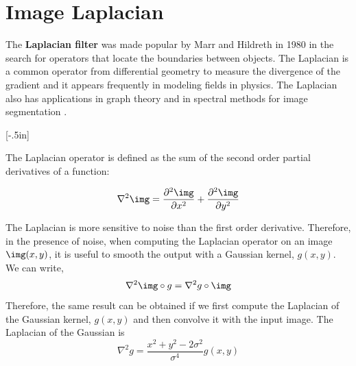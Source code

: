 

\section{Image Laplacian}

The {\bf Laplacian filter}
was made popular by Marr and Hildreth in 1980 \cite{Marr80} in the search for operators that locate the boundaries between objects. The Laplacian is a common operator from differential geometry to measure the divergence of the gradient and it appears frequently in modeling fields in physics.
The Laplacian also has applications in graph theory and in spectral methods for image segmentation \cite{ng2002}.

[-.5in]

The  Laplacian operator is defined as the sum of the second order partial derivatives of a function:

\begin{equation}
	\nabla^2 \img = \frac{\partial^2 \img}{\partial x^2} + \frac{\partial^2 \img}{\partial y^2}
\end{equation}

The Laplacian is more sensitive to noise than the first order derivative. Therefore, in the presence of noise,  when computing the Laplacian operator on an image $\img(x,y)$, it is useful to smooth the output with a Gaussian kernel, $g(x,y)$. We can write,
\begin{equation}
	\nabla^2 \img \circ g = \nabla^2 g \circ \img
\end{equation}
Therefore, the same result can be obtained if we first compute the Laplacian of the Gaussian kernel, $g(x,y)$ and then convolve it with the input image. The Laplacian of the Gaussian is
\begin{equation}
	\nabla^2 g = \frac{x^2 + y^2 -2\sigma^2}{\sigma^4} g(x,y)
\end{equation}

